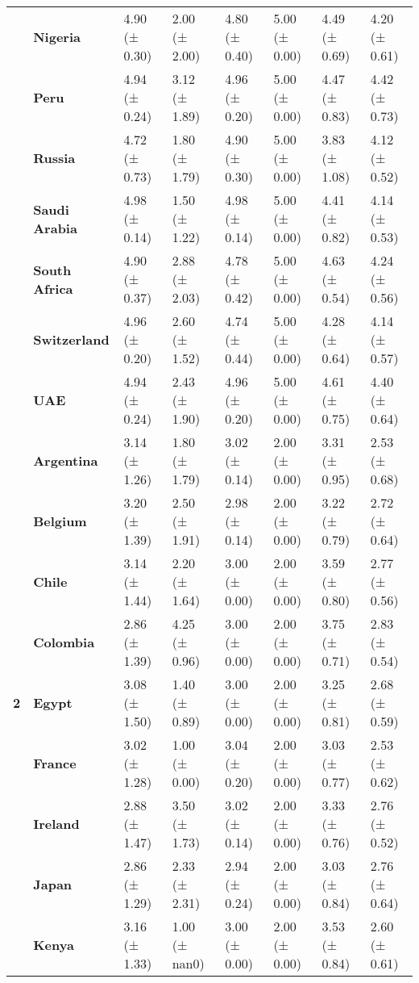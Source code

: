 \begin{longtable}{llllllll}
\textbf{} & \textbf{Nigeria} & 4.90 (± 0.30) & 2.00 (± 2.00) & 4.80 (± 0.40) & 5.00 (± 0.00) & 4.49 (± 0.69) & 4.20 (± 0.61) \\
\textbf{} & \textbf{Peru} & 4.94 (± 0.24) & 3.12 (± 1.89) & 4.96 (± 0.20) & 5.00 (± 0.00) & 4.47 (± 0.83) & 4.42 (± 0.73) \\
\textbf{} & \textbf{Russia} & 4.72 (± 0.73) & 1.80 (± 1.79) & 4.90 (± 0.30) & 5.00 (± 0.00) & 3.83 (± 1.08) & 4.12 (± 0.52) \\
\textbf{} & \textbf{Saudi Arabia} & 4.98 (± 0.14) & 1.50 (± 1.22) & 4.98 (± 0.14) & 5.00 (± 0.00) & 4.41 (± 0.82) & 4.14 (± 0.53) \\
\textbf{} & \textbf{South Africa} & 4.90 (± 0.37) & 2.88 (± 2.03) & 4.78 (± 0.42) & 5.00 (± 0.00) & 4.63 (± 0.54) & 4.24 (± 0.56) \\
\textbf{} & \textbf{Switzerland} & 4.96 (± 0.20) & 2.60 (± 1.52) & 4.74 (± 0.44) & 5.00 (± 0.00) & 4.28 (± 0.64) & 4.14 (± 0.57) \\
\textbf{} & \textbf{UAE} & 4.94 (± 0.24) & 2.43 (± 1.90) & 4.96 (± 0.20) & 5.00 (± 0.00) & 4.61 (± 0.75) & 4.40 (± 0.64) \\
\cline{1-8}
\multirow[t]{19}{*}{\textbf{2}} & \textbf{Argentina} & 3.14 (± 1.26) & 1.80 (± 1.79) & 3.02 (± 0.14) & 2.00 (± 0.00) & 3.31 (± 0.95) & 2.53 (± 0.68) \\
\textbf{} & \textbf{Belgium} & 3.20 (± 1.39) & 2.50 (± 1.91) & 2.98 (± 0.14) & 2.00 (± 0.00) & 3.22 (± 0.79) & 2.72 (± 0.64) \\
\textbf{} & \textbf{Chile} & 3.14 (± 1.44) & 2.20 (± 1.64) & 3.00 (± 0.00) & 2.00 (± 0.00) & 3.59 (± 0.80) & 2.77 (± 0.56) \\
\textbf{} & \textbf{Colombia} & 2.86 (± 1.39) & 4.25 (± 0.96) & 3.00 (± 0.00) & 2.00 (± 0.00) & 3.75 (± 0.71) & 2.83 (± 0.54) \\
\textbf{} & \textbf{Egypt} & 3.08 (± 1.50) & 1.40 (± 0.89) & 3.00 (± 0.00) & 2.00 (± 0.00) & 3.25 (± 0.81) & 2.68 (± 0.59) \\
\textbf{} & \textbf{France} & 3.02 (± 1.28) & 1.00 (± 0.00) & 3.04 (± 0.20) & 2.00 (± 0.00) & 3.03 (± 0.77) & 2.53 (± 0.62) \\
\textbf{} & \textbf{Ireland} & 2.88 (± 1.47) & 3.50 (± 1.73) & 3.02 (± 0.14) & 2.00 (± 0.00) & 3.33 (± 0.76) & 2.76 (± 0.52) \\
\textbf{} & \textbf{Japan} & 2.86 (± 1.29) & 2.33 (± 2.31) & 2.94 (± 0.24) & 2.00 (± 0.00) & 3.03 (± 0.84) & 2.76 (± 0.64) \\
\textbf{} & \textbf{Kenya} & 3.16 (± 1.33) & 1.00 (± nan0) & 3.00 (± 0.00) & 2.00 (± 0.00) & 3.53 (± 0.84) & 2.60 (± 0.61) \\

\end{longtable}
